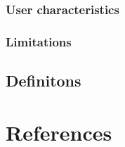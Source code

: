 \documentclass{scrreprt}
\begin{document}


\subsection{User characteristics}
%


\subsection{Limitations}


\section{Definitons}


\chapter{References}
\end{document}

